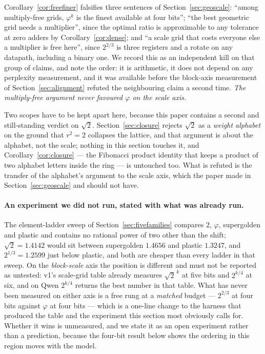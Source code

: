 \documentclass[11pt]{article}
\theoremstyle{definition}
\begin{document}
Corollary~\ref{cor:freefiner} falsifies three sentences of
Section~\ref{sec:geoscale}: ``among multiply-free grids, $\varphi^{k}$ is the
finest available at four bits''; ``the best geometric grid needs a
multiplier'', since the optimal ratio is approximable to any tolerance at zero
adders by Corollary~\ref{cor:dense}; and ``a scale grid that costs everyone else
a multiplier is free here'', since $2^{2/3}$ is three registers and a rotate on
any datapath, including a binary one. We record this as an independent kill on
that group of claims, and note the order: it is arithmetic, it does not depend
on any perplexity measurement, and it was available before the block-axis
measurement of Section~\ref{sec:alignment} refuted the neighbouring claim a
second time. \emph{The multiply-free argument never favoured $\varphi$ on the
scale axis.}

Two scopes have to be kept apart here, because this paper contains a second and
still-standing verdict on $\sqrt2$. Section~\ref{sec:closure} rejects $\sqrt2$
as a \emph{weight alphabet} on the ground that $r^{2}=2$ collapses the lattice,
and that argument is about the alphabet, not the scale; nothing in this section
touches it, and Corollary~\ref{cor:closure} --- the Fibonacci product identity
that keeps a product of two alphabet letters inside the ring --- is untouched
too. What is refuted is the transfer of the alphabet's argument to the scale
axis, which the paper made in Section~\ref{sec:geoscale} and should not have.

\paragraph{An experiment we did not run, stated with what was already run.} The
element-ladder sweep of Section~\ref{sec:fivefamilies} compares $2$, $\varphi$,
supergolden and plastic and contains no rational power of two other than the
shift; $\sqrt2=1.4142$ would sit between supergolden $1.4656$ and plastic
$1.3247$, and $2^{1/3}=1.2599$ just below plastic, and both are cheaper than
every ladder in that sweep. On the \emph{block-scale} axis the position is
different and must not be reported as untested: v1's scale-grid table already
measures $\sqrt2^{\,k}$ at five bits and $2^{k/4}$ at six, and on Qwen $2^{k/4}$
returns the best number in that table. What has never been measured on either
axis is a free rung at a \emph{matched} budget --- $2^{2/3}$ at four bits
against $\varphi$ at four bits --- which is a one-line change to the harness
that produced the table and the experiment this section most obviously calls
for. Whether it wins is unmeasured, and we state it as an open experiment rather
than a prediction, because the four-bit result below shows the ordering in this
region moves with the model.
\end{document}
